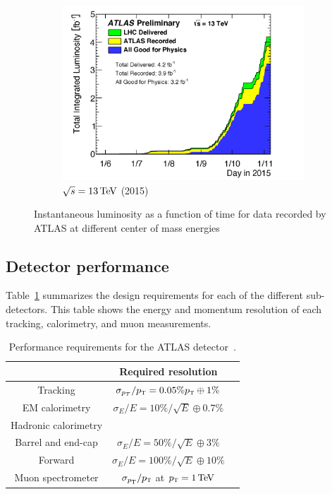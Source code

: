 \begin{figure}[h!]
\begin{subfigure}[t]{0.5\textwidth}
        \includegraphics[width=\textwidth]{figures/ATLAS_lumi_2015}
        \caption{$\sqrt{s} = 13 \TeV$ (2015)}
    \end{subfigure}

   \caption{Instantaneous luminosity as a function of time for data recorded by ATLAS at different center of mass energies~\cite{Lumi_Run1, Lumi_Run2}}
  \label{fig:lumis}
\end{figure}

\subsection{Detector performance}

Table~\ref{tab:performance} summarizes the design requirements for each of the different sub-detectors. This table shows the energy and momentum resolution of each tracking, calorimetry, and muon measurements. 

\begin{table}[h!]
\centering
\captionsetup{justification=centering}

\hspace{-10pt}
\begin{tabular}{|c|c|c|}
\hline
 & Required resolution \\ \hline
Tracking & $\sigma_{p_{T}}/p_{\textrm{\footnotesize\sc t}} = 0.05\% p_{\textrm{\footnotesize\sc t}} \oplus 1\%$ \\ \hline
EM calorimetry & $\sigma_E/E = 10\%/\sqrt{E} \oplus 0.7\%$ \\ \hline
Hadronic calorimetry & \\ 
Barrel and end-cap & $\sigma_E/E = 50\%/\sqrt{E} \oplus 3\%$ \\ 
Forward & $\sigma_E/E = 100\%/\sqrt{E} \oplus 10\%$ \\ \hline
Muon spectrometer & $\sigma_{p_{\textrm{\footnotesize\sc t}}}/p_{\textrm{\footnotesize\sc t}}$ at $\pT = 1 \TeV$ \\ \hline
\end{tabular}

\caption{
Performance requirements for the ATLAS detector~\cite{ATLASPaper}.
}
\label{tab:performance}
\end{table}


